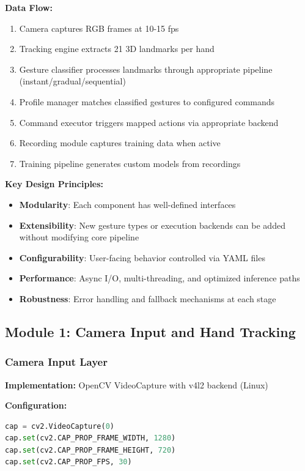 \documentclass[11pt,a4paper]{article}
\begin{document}
\textbf{Data Flow:}
\begin{enumerate}
\item Camera captures RGB frames at 10-15 fps
\item Tracking engine extracts 21 3D landmarks per hand
\item Gesture classifier processes landmarks through appropriate pipeline (instant/gradual/sequential)
\item Profile manager matches classified gestures to configured commands
\item Command executor triggers mapped actions via appropriate backend
\item Recording module captures training data when active
\item Training pipeline generates custom models from recordings
\end{enumerate}

\textbf{Key Design Principles:}
\begin{itemize}
\item \textbf{Modularity}: Each component has well-defined interfaces
\item \textbf{Extensibility}: New gesture types or execution backends can be added without modifying core pipeline
\item \textbf{Configurability}: User-facing behavior controlled via YAML files
\item \textbf{Performance}: Async I/O, multi-threading, and optimized inference paths
\item \textbf{Robustness}: Error handling and fallback mechanisms at each stage
\end{itemize}

\subsection{Module 1: Camera Input and Hand Tracking}

\subsubsection{Camera Input Layer}

\textbf{Implementation:} OpenCV VideoCapture with v4l2 backend (Linux)

\textbf{Configuration:}
\begin{lstlisting}[language=Python]
cap = cv2.VideoCapture(0)
cap.set(cv2.CAP_PROP_FRAME_WIDTH, 1280)
cap.set(cv2.CAP_PROP_FRAME_HEIGHT, 720)
cap.set(cv2.CAP_PROP_FPS, 30)
\end{lstlisting}
\end{document}
